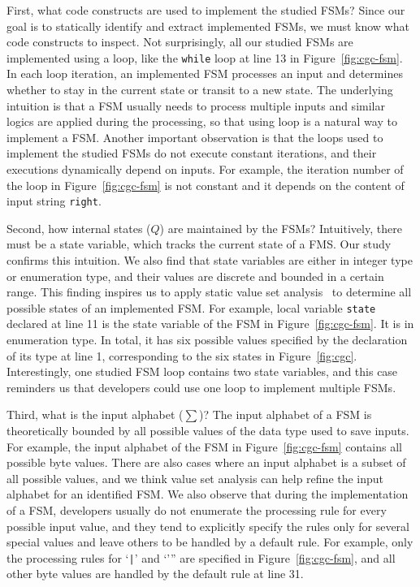 First, what code constructs are used to implement the studied FSMs?
Since our goal is to statically identify and extract implemented FSMs, 
we must know what code constructs to inspect. 
Not surprisingly, all our studied FSMs are implemented using a loop, 
like the \texttt{while} loop at line 13 in Figure~\ref{fig:cgc-fsm}.  
In each loop iteration, an implemented FSM processes an input and 
determines whether to stay in the current state or transit to a new state. 
The underlying intuition is that a FSM usually needs to process 
multiple inputs and similar logics are applied during the processing, 
so that using loop is a natural way to implement a FSM. 
Another important observation is that 
the loops used to implement the studied FSMs do not execute constant iterations,
and their executions dynamically depend on inputs. 
For example, the iteration number of the loop in Figure~\ref{fig:cgc-fsm}
is not constant and it 
depends on the content of input string \texttt{right}.


Second, how internal states ($Q$) are maintained by the FSMs?
Intuitively, there must be a state variable, which tracks the current state of a FMS.
Our study confirms this intuition. 
We also find that state variables are either in integer type or enumeration type,
and their values are discrete and bounded in a certain range. 
This finding inspires us to apply static value set analysis~\cite{DEEPVSA,VSA} 
to determine all possible states of an implemented FSM.
For example, local variable \texttt{state} declared at line 11
is the state variable of the FSM in Figure~\ref{fig:cgc-fsm}.
It is in enumeration type.
In total, it has six possible values specified by the declaration of 
its type at line 1, corresponding to 
the six states in Figure~\ref{fig:cgc}.
Interestingly, one studied FSM loop contains two state variables,
and this case reminders us that developers could use one loop 
to implement multiple FSMs. 


Third, what is the input alphabet ($\sum$)? 
The input alphabet of a FSM is theoretically bounded by all possible values 
of the data type used to save inputs. 
For example, the input alphabet of the FSM 
in Figure~\ref{fig:cgc-fsm} 
contains all possible byte values.
There are also cases where an input alphabet is a subset of all possible values, 
and we think value set analysis can help refine 
the input alphabet for an identified FSM.
We also observe that during the implementation of a FSM, 
developers usually do not enumerate the processing rule for every possible
input value, 
and they tend to explicitly specify the rules only for several special values
and leave others to be handled by a default rule. 
For example, only the processing rules for `\verb/|/' and `''' 
are specified in Figure~\ref{fig:cgc-fsm}, 
and all other byte values are handled by 
the default rule at line 31. 


